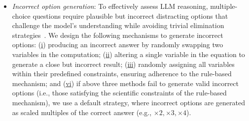\begin{itemize}[topsep=5pt, leftmargin=1em]
\vspace{-0.35em}
\item \textit{Incorrect option generation}: To effectively assess LLM reasoning, multiple-choice questions require plausible but incorrect distracting options that challenge the model's understanding while avoiding trivial elimination strategies~\cite{yue2024mmmuprorobustmultidisciplinemultimodal}. We design the following mechanisms to generate incorrect options: (\underline{i}) producing an incorrect answer by randomly swapping two variables in the computation; (\underline{ii}) altering a single variable in the equation to generate a close but incorrect result;
(\underline{iii}) randomly assigning all variables within their predefined constraints, ensuring adherence to the rule-based mechanism; and (\underline{vi}) if above three methods fail to generate valid incorrect options (i.e., those satisfying the scientific constraints of the rule-based mechanism), we use a default strategy, where incorrect options are generated as scaled multiples of the correct answer (e.g., $\times2, \times3, \times4$).



\vspace{-0.5em}
\end{itemize}




















